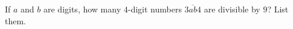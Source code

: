 If $a$ and $b$ are digits, how many $4$-digit numbers $\overline{3ab4}$ are divisible by $9$? List them.
